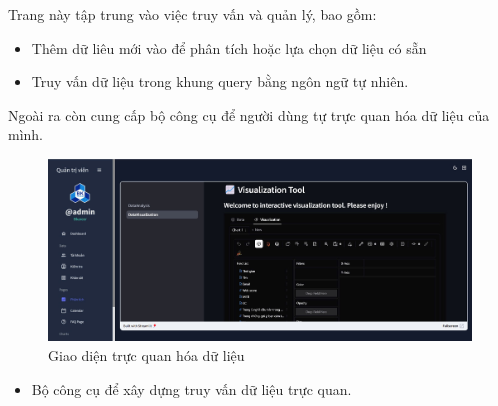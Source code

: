 Trang này tập trung vào việc truy vấn và quản lý, bao gồm:
\begin{itemize}
    \item Thêm dữ liêu mới vào để phân tích hoặc lựa chọn dữ liệu có sẵn
    \item Truy vấn dữ liệu trong khung query bằng ngôn ngữ tự nhiên.
\end{itemize}

Ngoài ra còn cung cấp bộ công cụ để người dùng tự trực quan hóa dữ liệu của mình.
\begin{figure}[H]
    \centering
    \includegraphics[width=0.75\linewidth]{images/admin2.jpg}
    \vspace{0.6cm}
    \caption{Giao diện trực quan hóa dữ liệu}
\end{figure}

\begin{itemize}
    \item Bộ công cụ để xây dựng truy vấn dữ liệu trực quan.
\end{itemize}
